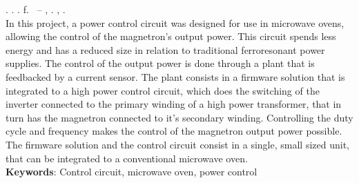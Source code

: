
\begin{resumo}[ABSTRACT]
\begin{SingleSpacing}

\imprimirautorcitacao. \imprimirtitleabstract. \imprimirdata. \pageref {LastPage} f. \imprimirprojeto\ – \imprimirprograma, \imprimirinstituicao. \imprimirlocal, \imprimirdata.\\


In this project, a power control circuit was designed for use in microwave ovens, allowing the control of the magnetron's output power. This circuit spends less energy and has a reduced size in relation to traditional ferroresonant power supplies. The control of the output power is done through a plant that is feedbacked by a current sensor. The plant consists in a firmware solution that is integrated to a high power control circuit, which does the switching of the inverter connected to the primary winding of a high power transformer, that in turn has the magnetron connected to it’s secondary winding. Controlling the duty cycle and frequency makes the control of the magnetron output power possible. The firmware solution and the control circuit consist in a single, small sized unit, that can be integrated to a conventional microwave oven.\\


\textbf{Keywords}: Control circuit, microwave oven, power control 

\end{SingleSpacing}
\end{resumo}

